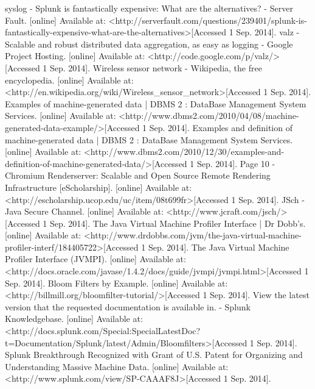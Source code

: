 \documentclass{llncs}
\begin{document}
\begin{thebibliography}{}
 syslog - Splunk is fantastically expensive: What are the alternatives? - Server Fault. [online] Available at: \textless http://serverfault.com/questions/239401/splunk-is-fantastically-expensive-what-are-the-alternatives\textgreater [Accessed 1 Sep. 2014].
 valz - Scalable and robust distributed data aggregation, as easy as logging - Google Project Hosting. [online] Available at: \textless http://code.google.com/p/valz/\textgreater [Accessed 1 Sep. 2014].
Wireless sensor network - Wikipedia, the free encyclopedia. [online] Available at: \textless http://en.wikipedia.org/wiki/Wireless\_sensor\_network\textgreater [Accessed 1 Sep. 2014].
 Examples of machine-generated data | DBMS 2 : DataBase Management System Services. [online] Available at: \textless http://www.dbms2.com/2010/04/08/machine-generated-data-example/\textgreater [Accessed 1 Sep. 2014].
 Examples and definition of machine-generated data | DBMS 2 : DataBase Management System Services. [online] Available at: \textless http://www.dbms2.com/2010/12/30/examples-and-definition-of-machine-generated-data/\textgreater [Accessed 1 Sep. 2014].
 Page 10 - Chromium Renderserver: Scalable and Open Source Remote Rendering Infrastructure [eScholarship]. [online] Available at: \textless http://escholarship.ucop.edu/uc/item/08t699fr\textgreater [Accessed 1 Sep. 2014].
 JSch - Java Secure Channel. [online] Available at: \textless http://www.jcraft.com/jsch/\textgreater [Accessed 1 Sep. 2014].
 The Java Virtual Machine Profiler Interface | Dr Dobb’s. [online] Available at: \textless http://www.drdobbs.com/jvm/the-java-virtual-machine-profiler-interf/184405722\textgreater [Accessed 1 Sep. 2014].
 The Java Virtual Machine Profiler Interface (JVMPI). [online] Available at: \textless http://docs.oracle.com/javase/1.4.2/docs/guide/jvmpi/jvmpi.html\textgreater [Accessed 1 Sep. 2014].
 Bloom Filters by Example. [online] Available at: \textless http://billmill.org/bloomfilter-tutorial/\textgreater [Accessed 1 Sep. 2014].
 View the latest version that the requested documentation is available in. - Splunk Knowledgebase. [online] Available at:
\textless http://docs.splunk.com/Special:SpecialLatestDoc?t=Documentation/Splunk/latest/Admin/Bloomfilters\textgreater [Accessed 1 Sep. 2014].
 Splunk Breakthrough Recognized with Grant of U.S. Patent for Organizing and Understanding Massive Machine Data. [online] Available at: \textless http://www.splunk.com/view/SP-CAAAF8J\textgreater [Accessed 1 Sep. 2014].

\end{thebibliography}
\end{document}

